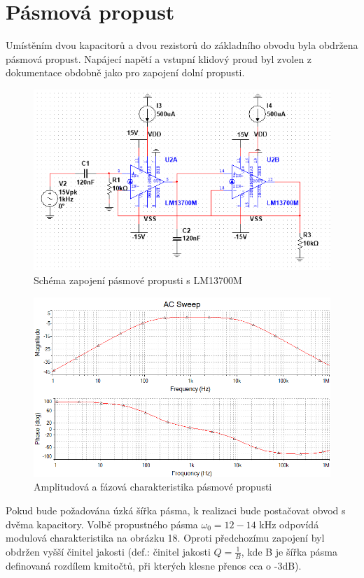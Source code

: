 \documentclass[twoside]{article}
\begin{document}
\section{Pásmová propust}
Umístěním dvou kapacitorů a dvou rezistorů do základního obvodu byla obdržena pásmová propust. Napájecí napětí a vstupní klidový proud byl zvolen z dokumentace obdobně jako pro zapojení dolní propusti.
\begin{figure}[H]
\centering
\includegraphics[scale=0.75]{bandpasszapojeni.png}
\caption{Schéma zapojení pásmové propusti s LM13700M}
\end{figure}
\begin{figure}[H]
\centering
\includegraphics[scale=0.75]{bandpass2.png}
\caption{Amplitudová a fázová charakteristika pásmové propusti}
\end{figure}
\noindent Pokud bude požadována úzká šířka pásma, k realizaci bude postačovat obvod s dvěma kapacitory. Volbě propustného pásma $\omega _0 = 12-14$ kHz odpovídá modulová charakteristika na obrázku 18. Oproti předchozímu zapojení byl obdržen vyšší činitel jakosti (def.: činitel jakosti $Q = \frac{1}{B}$, kde B je šířka pásma definovaná rozdílem kmitočtů, při kterých klesne přenos cca o -3dB).
\end{document}
